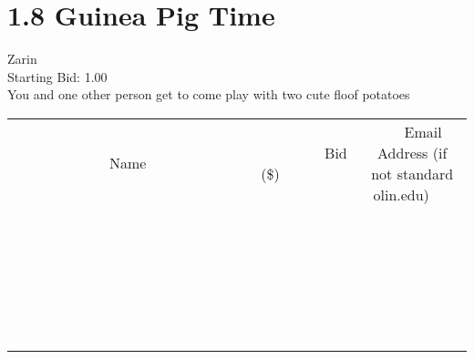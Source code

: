 \documentclass[11pt]{article}
\begin{document}
					\section*{1.8 Guinea Pig Time}
					Zarin \\
					Starting Bid: 1.00 \\
					You and one other person get to come play with two cute floof potatoes \\
					[6ex]
					\begin{tabular}{c c c}
						~~~~~~~~~~~~~Name~~~~~~~~~~~~~ & ~~~~~~~~~Bid (\$)~~~~~~~~~ & ~~~Email Address (if not standard olin.edu)~~~ \\
				
 & & \\
\hline
 & & \\
\hline
 & & \\
\hline
 & & \\
\hline
 & & \\
\hline
 & & \\
\hline
 & & \\
\hline
 & & \\
\hline
 & & \\
\hline
 & & \\
\hline
 & & \\
\hline
 & & \\
\hline
 & & \\
\hline
 & & \\
\hline
 & & \\
\hline
 & & \\
\hline
 & & \\
\hline
 & & \\
\hline
 & & \\
\hline
 & & \\
\hline
 & & \\
\hline
 & & \\
\hline
 & & \\
\hline
 & & \\
\hline
 & & \\
\hline
 & & \\
\hline
					\end{tabular}
					\clearpage
				
\end{document}
